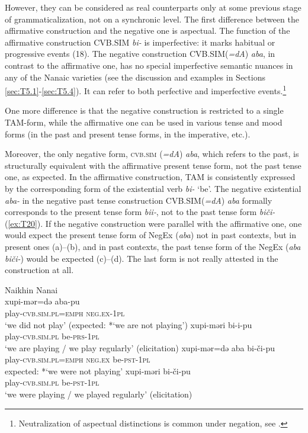 \documentclass[output=paper]{langscibook}
\begin{document}
However, they can be considered as real counterparts only at some previous stage of grammaticalization, not on a synchronic level. The first difference between the affirmative construction and the negative one is aspectual. The function of the affirmative construction CVB.SIM \textit{bi-} is imperfective: it marks habitual or progressive events (18). The negative construction CVB.SIM(\textit{=dA}) \textit{aba}, in contrast to the affirmative one, has no special imperfective semantic nuances in any of the Nanaic varieties (see the discussion and examples in Sections \ref{sec:T5.1}-\ref{sec:T5.4}). It can refer to both perfective and imperfective events.\footnote{Neutralization of aspectual distinctions is common under negation, see \citet{Miestamo2005}.}

One more difference is that the negative construction is restricted to a single TAM-form, while the affirmative one can be used in various tense and mood forms (in the past and present tense forms, in the imperative, etc.).

Moreover, the only negative form, \textsc{cvb.sim} (\textit{=dA}) \textit{aba}, which refers to the past, is structurally equivalent with the affirmative present tense form, not the past tense one, as expected. In the affirmative construction, TAM is consistently expressed by the corresponding form of the existential verb \textit{bi-} ‘be’. The negative existential \textit{aba-} in the negative past tense construction CVB.SIM(\textit{=dA}) \textit{aba} formally corresponds to the present tense form \textit{bii‑}, not to the past tense form \textit{biči-} (\ref{ex:T20}). If the negative construction were parallel with the affirmative one, one would expect the present tense form of NegEx (\textit{aba}) not in past contexts, but in present ones (a)–(b), and in past contexts, the past tense form of the NegEx (\textit{aba biči-}) would be expected (c)–(d). The last form is not really attested in the construction at all.

\ea Naikhin Nanai \label{ex:T21}\\
  \ea
	\gll xupi-mər=də	aba-pu {}\\
	play-\textsc{cvb.sim.pl=emph}	\textsc{neg.ex-1pl}	~	\\
	\glt `we did not play' (expected: *`we are not playing')
  \ex
	\gll xupi-məri			bi-i-pu\\
	play-\textsc{cvb.sim.pl}	be-\textsc{prs-1pl}\\
    \glt `we are playing / we play regularly' (elicitation)
  \ex
	\gll *xupi-mər=də	aba		bi-či-pu\\
	play-\textsc{cvb.sim.pl=emph}	\textsc{neg.ex}		be-\textsc{pst-1pl}\\
    \glt expected: *`we were not playing'
  \ex
	\gll xupi-məri			bi-či-pu\\
	play-\textsc{cvb.sim.pl}	be-\textsc{pst-1pl}\\
	\glt `we were playing / we played regularly' (elicitation)
\z \z
\end{document}
